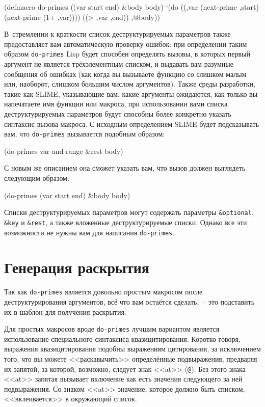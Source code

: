 \begin{myverb}
(defmacro do-primes ((var start end) &body body)
  `(do ((,var (next-prime ,start) (next-prime (1+ ,var))))
       ((> ,var ,end))
     ,@body))
\end{myverb}

В~стремлении к краткости список деструктурируемых параметров также предоставляет вам
автоматическую проверку ошибок: при определении таким образом \lstinline{do-primes} Lisp будет
способен определять вызовы, в которых первый аргумент не является трёхэлементным списком,
и выдавать вам разумные сообщения об ошибках (как когда вы вызываете функцию со слишком
малым или, наоборот, слишком большим числом аргументов). Также среды разработки, такие
как SLIME, указывающие вам, какие аргументы ожидаются, как только вы напечатаете имя
функции или макроса, при использовании вами списка деструктурируемых параметров будут
способны более конкретно указать синтаксис вызова макроса. С исходным определением SLIME
будет подсказывать вам, что \lstinline{do-primes} вызывается подобным образом:

\begin{myverb}
(do-primes var-and-range &rest body)
\end{myverb}

С новым же описанием она сможет указать вам, что вызов должен выглядеть следующим образом:

\begin{myverb}
(do-primes (var start end) &body body)
\end{myverb}

Списки деструктурируемых параметров могут содержать параметры \lstinline!&optional!,
\lstinline!&key! и \lstinline!&rest!, а также вложенные деструктурируемые списки. Однако
все эти возможности не нужны вам для написания \lstinline{do-primes}.

\section{Генерация раскрытия}

Так как \lstinline{do-primes} является довольно простым макросом после деструктурирования
аргументов, всё что вам остаётся сделать,~-- это подставить их в шаблон для получения
раскрытия.

Для простых макросов вроде \lstinline{do-primes} лучшим вариантом является использование
специального синтаксиса квазицитирования. Коротко говоря, выражения квазицитирования
подобны выражениям цитирования, за исключением того, что вы можете <<раскавычить>>
определённые подвыражения, предваряя их запятой, за которой, возможно, следует знак <<at>>
(\lstinline!@!). Без этого знака <<at>> запятая вызывает включение как есть значения
следующего за ней подвыражения. Со знаком <<at>> значение, которое должно быть списком,
<<вклеивается>> в окружающий список.

